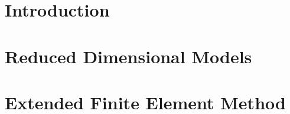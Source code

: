\documentclass[bibliography=totocnumbered,dvipsnames,FM,Dis,EN]{tulthesis}
\begin{document}
\tableofcontents
\clearpage


\listoffigures
\clearpage

\listoftables
\clearpage


\clearpage




\chapter{Introduction}







\chapter{Reduced Dimensional Models} \label{chap:reduced}







\chapter{Extended Finite Element Method} \label{chap:xfem_soa}


\end{document}
